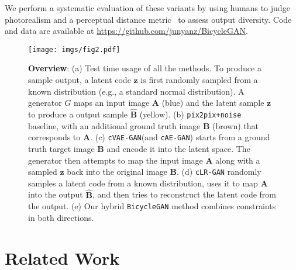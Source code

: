 \documentclass{article}
\newcommand{\ppn}{\texttt{pix2pix+noise}\xspace}
\newcommand{\cinfogan}{\texttt{cLR-GAN}\xspace}
\newcommand{\cae}{\texttt{cAE-GAN}\xspace}
\newcommand{\cvaegan}{\texttt{cVAE-GAN}\xspace}
\newcommand{\bicycle}{\texttt{BicycleGAN}\xspace} \newcommand{\G}{G\xspace}
\begin{document}
We perform a systematic evaluation of these variants by using humans to judge photorealism and a perceptual distance metric~\cite{zhang2018unreasonable} to assess output diversity. Code and data are available at \url{https://github.com/junyanz/BicycleGAN}. 
\begin{figure}
  \centering
  \texttt{[image: imgs/fig2.pdf]}
\caption{\small \textbf{Overview}: (a) Test time usage of all the methods. To produce a sample output, a latent code $\mathbf{z}$ is first randomly sampled from a known distribution (e.g., a standard normal distribution). A generator $\G$ maps an input image $\mathbf{A}$ (blue) and the latent sample $\mathbf{z}$ to produce a output sample $\mathbf{\hat{B}}$ (yellow). (b) \ppn~\citep{isola2016image} baseline, with an additional ground truth image $\mathbf{B}$ (brown) that corresponds to $\mathbf{A}$. (c)  \cvaegan (and \cae) starts from a ground truth target image $\mathbf{B}$ and encode it into the latent space. The generator then attempts to map the input image $\mathbf{A}$ along with a sampled $\mathbf{z}$ back into the original image $\mathbf{B}$. (d) \cinfogan randomly samples a latent code from a known distribution, uses it to map $\mathbf{A}$ into the output $\mathbf{\hat{B}}$, and then tries to reconstruct the latent code from the output. (e) Our hybrid \bicycle method combines constraints in both directions.
}
\vspace{-5mm}
\label{fig:fig2}
\end{figure}

\section{Related Work}
\end{document}
